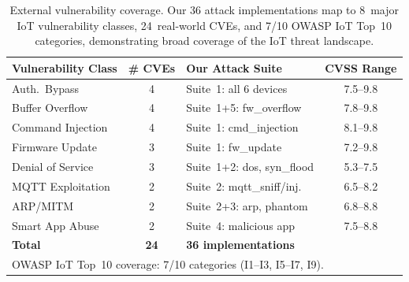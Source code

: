 \begin{table}[t]
  \centering
  \caption{External vulnerability coverage.  Our 36 attack implementations
  map to 8~major IoT vulnerability classes, 24~real-world CVEs, and 7/10
  OWASP IoT Top~10 categories, demonstrating broad coverage of the
  IoT threat landscape.}
  \label{tab:cve-validation}
  \small
  \begin{tabular}{l c l c}
    \toprule
    {Vulnerability Class} & {\# CVEs} & {Our Attack Suite} & {CVSS Range} \\
    \midrule
    Auth.\ Bypass         & 4 & Suite~1: all 6 devices    & 7.5--9.8 \\
    Buffer Overflow       & 4 & Suite~1+5: fw\_overflow    & 7.8--9.8 \\
    Command Injection     & 4 & Suite~1: cmd\_injection    & 8.1--9.8 \\
    Firmware Update       & 3 & Suite~1: fw\_update        & 7.2--9.8 \\
    Denial of Service     & 3 & Suite~1+2: dos, syn\_flood & 5.3--7.5 \\
    MQTT Exploitation     & 2 & Suite~2: mqtt\_sniff/inj.  & 6.5--8.2 \\
    ARP/MITM              & 2 & Suite~2+3: arp, phantom   & 6.8--8.8 \\
    Smart App Abuse       & 2 & Suite~4: malicious app    & 7.5--8.8 \\
    \midrule
    \textbf{Total}        & \textbf{24} & \textbf{36 implementations} & \\
    \bottomrule
    \multicolumn{4}{l}{\footnotesize OWASP IoT Top~10 coverage: 7/10 categories (I1--I3, I5--I7, I9).} \\
  \end{tabular}
\end{table}
